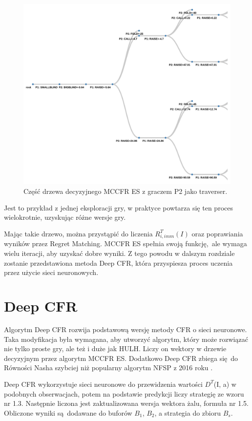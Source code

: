 \documentclass[12pt,oneside,a4paper]{report}
\begin{document}
\begin{figure}[!ht]
  \centering
  \includegraphics[width=1\textwidth]{./img/tree.pdf}
  \caption{Część drzewa decyzyjnego MCCFR ES z graczem P2 jako traverser.}
\end{figure}


\vspace{5cm}
Jest to przykład z jednej eksploracji gry, w praktyce powtarza się ten proces wielokrotnie, 
uzyskując różne wersje gry.


Mając takie drzewo, można przystąpić do liczenia $R_{i,imm}^{T} (I)$ oraz poprawiania 
wyników przez Regret Matching. MCCFR ES spełnia swoją funkcję, ale wymaga wielu iteracji, aby
uzyskać dobre wyniki. Z tego powodu w dalszym rozdziale zostanie przedstawiona metoda Deep CFR,
która przyspiesza proces uczenia przez użycie sieci neuronowych.

\section{Deep CFR}


Algorytm Deep CFR rozwija podstawową wersję metody CFR o sieci neuronowe.
Taka modyfikacja była wymagana, aby utworzyć algorytm, który może rozwiązać nie tylko proste gry,
ale też i duże jak HULH. Liczy on wektory w drzewie decyzyjnym
przez algorytm MCCFR ES. Dodatkowo Deep CFR zbiega się do Równości Nasha szybciej niż 
popularny algorytm NFSP z 2016 roku \cite{DCFR}.

Deep CFR wykorzystuje sieci neuronowe do przewidzenia wartości $D^{T}$(I, a) w podobnych
obserwacjach, potem na
podstawie predykcji liczy strategię ze wzoru nr 1.3.   
Następnie liczona jest zaktualizowana wersja wektora żalu, formuła nr 1.5.
Obliczone wyniki są dodawane do buforów $B_{1}$, $B_{2}$, a strategia do zbioru $B_{s}$.
\end{document}
